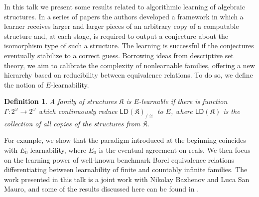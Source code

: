 \documentclass[bsl,meeting]{asl}
\newtheorem{definition}{Definition}
\newcommand{\NP}{}
\begin{document}
\thispagestyle{empty}
\NP  
{}

In this talk we present some results related to algorithmic learning of algebraic structures. In a series of papers \cite{FKS-19, bazhenov2020learning, bazhenov2021turing} the authors developed a framework in which a learner receives larger and larger pieces of an arbitrary
copy of a computable structure and, at each stage, is required to output a conjecture about the isomorphism type of such a structure. The learning is successful if the conjectures eventually stabilize to a correct
guess. Borrowing ideas from descriptive set theory, we aim to calibrate the complexity of nonlearnable families, offering a new hierarchy based on reducibility between equivalence relations. To do so, we define the notion of $E$-learnability. 
\begin{definition}
A family of structures $\mathfrak{K}$ is $E$-learnable if there is function $\Gamma : 2^\omega \rightarrow 2^\omega$ which continuously reduce $\mathsf{LD}(\mathfrak{K})_{/\cong}$ to $E$, where $\mathsf{LD}(\mathfrak{K})$ is the collection of all copies of the structures from $\mathfrak{K}$.
\end{definition}

For example, we show that the paradigm introduced at the beginning coincides with $E_0$-learnability, where $E_0$ is the eventual agreement on reals. We then focus on the learning power of well-known benchmark Borel equivalence relations differentiating between learnability of finite and countably infinite families. 
The work presented in this talk is a joint work with Nikolay Bazhenov and Luca San Mauro, and some of the results discussed here can be found in \cite{bcsm21}.
\end{document}
